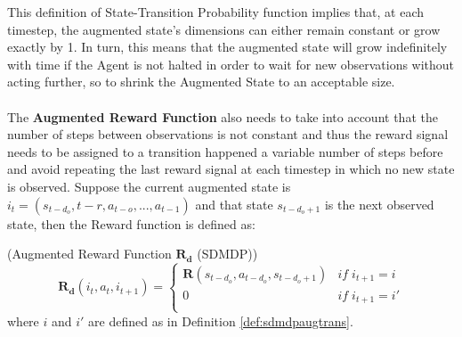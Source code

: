                 This definition of State-Transition Probability function implies that, at each timestep, the augmented state's dimensions can either remain constant or grow exactly by 1. In turn, this means that the augmented state will grow indefinitely with time if the Agent is not halted in order to wait for new observations without acting further, so to shrink the Augmented State to an acceptable size.
                \\\\
                The \textbf{Augmented Reward Function} also needs to take into account that the number of steps between observations is not constant and thus the reward signal needs to be assigned to a transition happened a variable number of steps before and avoid repeating the last reward signal at each timestep in which no new state is observed. Suppose the current augmented state is $i_t = \left( s_{t-d_o}, t-r, a_{t-o}, ..., a_{t-1} \right)$ and that state $s_{t-d_o+1}$ is the next observed state, then the Reward function is defined as:
                \begin{definition}(Augmented Reward Function $\mathbf{R_d}$ (SDMDP))
                    \label{def:sdmdpaugrew}
                    \[ \mathbf{R_d} \left( i_t, a_t, i_{t+1} \right) =  
                        \begin{cases} 
                            \mathbf{R} \left( s_{t-d_o}, a_{t-d_o}, s_{t-d_o+1} \right) & if \; i_{t+1} = i \\
                            0 & if \; i_{t+1} = i'\\ 
                        \end{cases}
                    \]
                where $i$ and $i'$ are defined as in Definition \ref{def:sdmdpaugtrans}.
                \end{definition}
                
